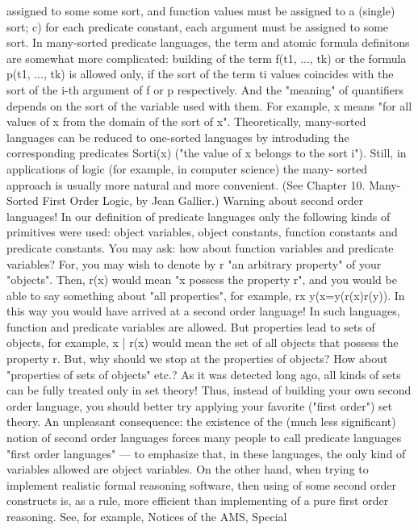 assigned to some some sort, and function values must be assigned to a (single) sort; c) for each predicate constant, each
argument must be assigned to some sort. In many-sorted predicate languages, the term and atomic formula definitons are
somewhat more complicated: building of the term f(t1, ..., tk) or the formula p(t1, ..., tk) is allowed only, if the sort of the term ti
values coincides with the sort of the i-th argument of f or p respectively. And the "meaning" of quantifiers depends on the sort
of the variable used with them. For example, \forall x means "for all values of x from the domain of the sort of x".
Theoretically, many-sorted languages can be reduced to one-sorted languages by introduding the corresponding predicates
Sorti(x) ("the value of x belongs to the sort i"). Still, in applications of logic (for example, in computer science) the many-
sorted approach is usually more natural and more convenient. (See Chapter 10. Many-Sorted First Order Logic, by Jean
Gallier.)
Warning about second order languages!
In our definition of predicate languages only the following kinds of primitives were used: object variables, object constants,
function constants and predicate constants. You may ask: how about function variables and predicate variables? For, you
may wish to denote by r "an arbitrary property" of your "objects". Then, r(x) would mean "x possess the property r", and you
would be able to say something about "all properties", for example, \forall r\forall x \forall y(x=y\IMPLIES (r(x)\IFF r(y)). In this way you would have
arrived at a second order language! In such languages, function and predicate variables are allowed. But properties lead to
sets of objects, for example, {x | r(x)} would mean the set of all objects that possess the property r. But, why should we stop at
the properties of objects? How about "properties of sets of objects" etc.? As it was detected long ago, all kinds of sets can be
fully treated only in set theory! Thus, instead of building your own second order language, you should better try applying your
favorite ("first order") set theory. An unpleasant consequence: the existence of the (much less significant) notion of second
order languages forces many people to call predicate languages "first order languages" --- to emphasize that, in these
languages, the only kind of variables allowed are object variables.
On the other hand, when trying to implement realistic formal reasoning software, then using of some second order constructs
is, as a rule, more efficient than implementing of a pure first order reasoning. See, for example, Notices of the AMS, Special
